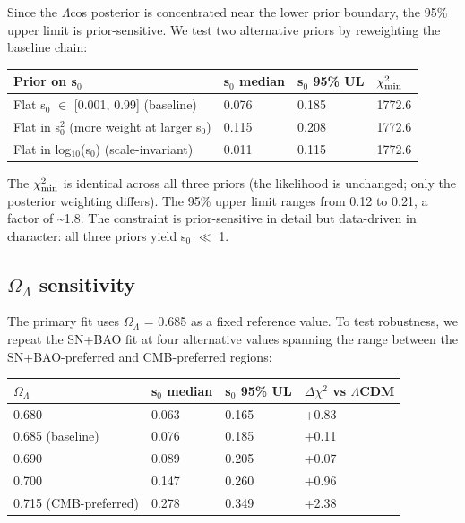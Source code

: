 Since the $\Lambda$cos posterior is concentrated near the lower prior boundary,
the 95\% upper limit is prior-sensitive. We test two alternative priors
by reweighting the baseline chain:

{\def\LTcaptype{none} %
\begin{table}[!htb]
\centering\footnotesize
\begin{tabular}{@{}llll@{}}
\toprule
Prior on s$_0$ & s$_0$ median & s$_0$ 95\% UL & $\chi^2_{\rm min}$ \\
\midrule

Flat s$_0$ $\in$ {[}0.001, 0.99{]} (baseline) & 0.076 & 0.185 & 1772.6 \\
Flat in s$_0^2$ (more weight at larger s$_0$) & 0.115 & 0.208 & 1772.6 \\
Flat in log$_{10}$(s$_0$) (scale-invariant) & 0.011 & 0.115 & 1772.6 \\
\bottomrule
\end{tabular}
\end{table}
}

The $\chi^2_{\rm min}$ is identical across all three priors (the likelihood is
unchanged; only the posterior weighting differs). The 95\% upper limit
ranges from 0.12 to 0.21, a factor of \textasciitilde1.8. The constraint
is prior-sensitive in detail but data-driven in character: all three
priors yield s$_0$ $\ll$ 1.

\subsection{$\Omega_\Lambda$ sensitivity}\label{sec:omega-sensitivity}

The primary fit uses $\Omega_\Lambda$ = 0.685 as a fixed reference value. To test
robustness, we repeat the SN+BAO fit at four alternative values spanning
the range between the SN+BAO-preferred and CMB-preferred regions:

{\def\LTcaptype{none} %
\begin{table}[!htb]
\centering\footnotesize
\begin{tabular}{@{}llll@{}}
\toprule
$\Omega_\Lambda$ & s$_0$ median & s$_0$ 95\% UL & $\Delta\chi^2$ vs $\Lambda$CDM \\
\midrule

0.680 & 0.063 & 0.165 & +0.83 \\
0.685 (baseline) & 0.076 & 0.185 & +0.11 \\
0.690 & 0.089 & 0.205 & +0.07 \\
0.700 & 0.147 & 0.260 & +0.96 \\
0.715 (CMB-preferred) & 0.278 & 0.349 & +2.38 \\
\bottomrule
\end{tabular}
\end{table}
}

